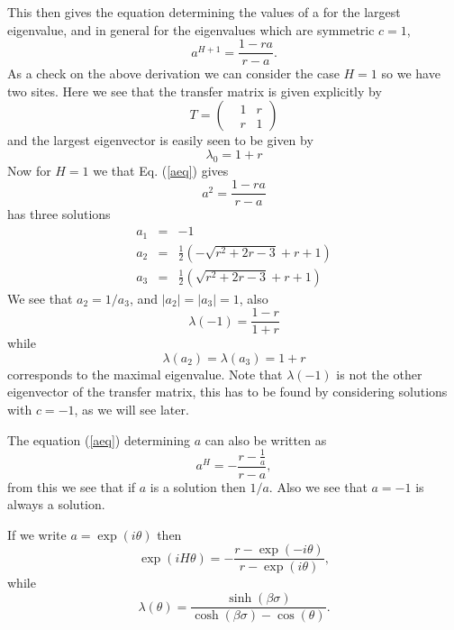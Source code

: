 This then gives the equation determining the values of a for the largest eigenvalue, and in general for the eigenvalues which are symmetric $c=1$,
\begin{equation}
a^{H+1} =  \frac{1-ra}{r-a}.\label{aeq}
\end{equation}
As a check on the above derivation we can consider the case $H=1$ so we have two sites. Here we see that the transfer matrix is given explicitly by
\begin{equation}
T =\begin{pmatrix} & 1 & r\\& r &1\end{pmatrix}
\end{equation}
and the largest eigenvector is easily seen to be given by
\begin{equation}
\lambda_0 = 1+r 
\end{equation}
Now for $H=1$ we that Eq. (\ref{aeq}) gives
\begin{equation}
a^{2} =  \frac{1-ra}{r-a}
\end{equation}
has three solutions
\begin{eqnarray}
a_1&=& -1\\
a_2&=& \frac{1}{2} \left(-\sqrt{r^2+2
   r-3}+r+1\right)    \\
a_3&=& \frac{1}{2} \left(\sqrt{r^2+2
   r-3}+r+1\right)\end{eqnarray}
We see that $a_2=1/a_3$, and $|a_2|=|a_3|=1$, also
\begin{equation}
\lambda(-1)= \frac{1-r}{1+r}
\end{equation}
while 
\begin{equation}
\lambda(a_2)=\lambda(a_3)= 1+r
\end{equation}
corresponds to the maximal eigenvalue. Note that $\lambda(-1)$ is not the other  eigenvector of the transfer matrix, this has to be found by considering solutions with $c=-1$, as we will see later.

The equation  (\ref{aeq}) determining $a$ can also be written as
\begin{equation}
a^{H} = - \frac{r-\frac{1}{a}}{r-a},
\end{equation}
from this we see that if $a$ is a solution then $1/a$. Also we see that $a=-1$ is always a solution.

If we write $a=\exp(i\theta)$ then 
\begin{equation}
\exp(iH\theta) = - \frac{r-\exp(-i\theta)}{r-\exp(i\theta)},\label{thetamas}
\end{equation}
while
\begin{equation}
\lambda(\theta) = \frac{\sinh(\beta\sigma)}{\cosh(\beta\sigma) - \cos(\theta)}.
\end{equation}

